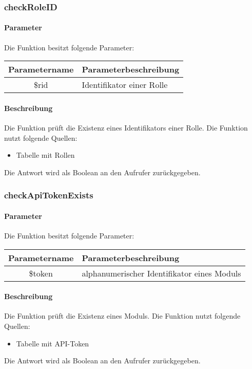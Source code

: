\subsubsection{checkRoleID}
\paragraph{Parameter} Die Funktion besitzt folgende Parameter:
\begin{table}[H]
	\begin{tabular}{|c|p{11cm}|}
		\hline
		\textbf{Parametername} & \textbf{Parameterbeschreibung} \\ \hline
		\$rid & Identifikator einer Rolle \\ \hline
	\end{tabular}
\end{table}
\paragraph{Beschreibung} Die Funktion prüft die Existenz eines Identifikators einer Rolle. Die Funktion nutzt folgende Quellen:
\begin{itemize}
	\item Tabelle mit Rollen
\end{itemize}
Die Antwort wird als Boolean an den Aufrufer zurückgegeben.
\subsubsection{checkApiTokenExists}
\paragraph{Parameter} Die Funktion besitzt folgende Parameter:
\begin{table}[H]
	\begin{tabular}{|c|p{11cm}|}
		\hline
		\textbf{Parametername} & \textbf{Parameterbeschreibung} \\ \hline
		\$token & alphanumerischer Identifikator eines Moduls \\ \hline
	\end{tabular}
\end{table}
\paragraph{Beschreibung} Die Funktion prüft die Existenz eines Moduls. Die Funktion nutzt folgende Quellen:
\begin{itemize}
	\item Tabelle mit API-Token
\end{itemize}
Die Antwort wird als Boolean an den Aufrufer zurückgegeben.
